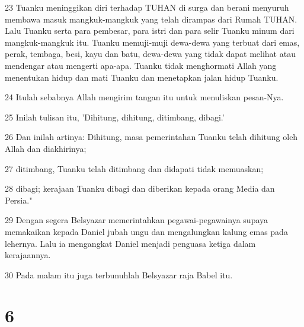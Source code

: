 \par 23 Tuanku meninggikan diri terhadap TUHAN di surga dan berani menyuruh membawa masuk mangkuk-mangkuk yang telah dirampas dari Rumah TUHAN. Lalu Tuanku serta para pembesar, para istri dan para selir Tuanku minum dari mangkuk-mangkuk itu. Tuanku memuji-muji dewa-dewa yang terbuat dari emas, perak, tembaga, besi, kayu dan batu, dewa-dewa yang tidak dapat melihat atau mendengar atau mengerti apa-apa. Tuanku tidak menghormati Allah yang menentukan hidup dan mati Tuanku dan menetapkan jalan hidup Tuanku.
\par 24 Itulah sebabnya Allah mengirim tangan itu untuk menuliskan pesan-Nya.
\par 25 Inilah tulisan itu, 'Dihitung, dihitung, ditimbang, dibagi.'
\par 26 Dan inilah artinya: Dihitung, masa pemerintahan Tuanku telah dihitung oleh Allah dan diakhirinya;
\par 27 ditimbang, Tuanku telah ditimbang dan didapati tidak memuaskan;
\par 28 dibagi; kerajaan Tuanku dibagi dan diberikan kepada orang Media dan Persia."
\par 29 Dengan segera Belsyazar memerintahkan pegawai-pegawainya supaya memakaikan kepada Daniel jubah ungu dan mengalungkan kalung emas pada lehernya. Lalu ia mengangkat Daniel menjadi penguasa ketiga dalam kerajaannya.
\par 30 Pada malam itu juga terbunuhlah Belsyazar raja Babel itu.

\chapter{6}

